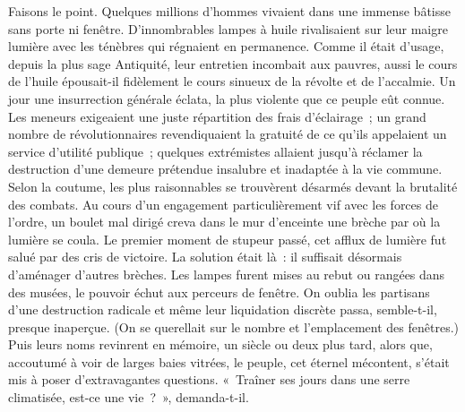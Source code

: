 \documentclass[french,twoside]{book} %
\newcommand{\astermono}{\medskip\centerline{\color{rubric}\large\selectfont{\syms ✻}}\medskip\par}%
\begin{document}
\noindent Faisons le point. Quelques millions d’hommes vivaient dans une immense bâtisse sans porte ni fenêtre. D’innombrables lampes à huile rivalisaient sur leur maigre lumière avec les ténèbres qui régnaient en permanence. Comme il était d’usage, depuis la plus sage Antiquité, leur entretien incombait aux pauvres, aussi le cours de l’huile épousait-il fidèlement le cours sinueux de la révolte et de l’accalmie. Un jour une insurrection générale éclata, la plus violente que ce peuple eût connue. Les meneurs exigeaient une juste répartition des frais d’éclairage ; un grand nombre de révolutionnaires revendiquaient la gratuité de ce qu’ils appelaient un service d’utilité publique ; quelques extrémistes allaient jusqu’à réclamer la destruction d’une demeure prétendue insalubre et inadaptée à la vie commune. Selon la coutume, les plus raisonnables se trouvèrent désarmés devant la brutalité des combats. Au cours d’un engagement particulièrement vif avec les forces de l’ordre, un boulet mal dirigé creva dans le mur d’enceinte une brèche par où la lumière se coula. Le premier moment de stupeur passé, cet afflux de lumière fut salué par des cris de victoire. La solution était là : il suffisait désormais d’aménager d’autres brèches. Les lampes furent mises au rebut ou rangées dans des musées, le pouvoir échut aux perceurs de fenêtre. On oublia les partisans d’une destruction radicale et même leur liquidation discrète passa, semble-t-il, presque inaperçue. (On se querellait sur le nombre et l’emplacement des fenêtres.) Puis leurs noms revinrent en mémoire, un siècle ou deux plus tard, alors que, accoutumé à voir de larges baies vitrées, le peuple, cet éternel mécontent, s’était mis à poser d’extravagantes questions. « Traîner ses jours dans une serre climatisée, est-ce une vie ? », demanda-t-il.\par

\astermono
\end{document}
